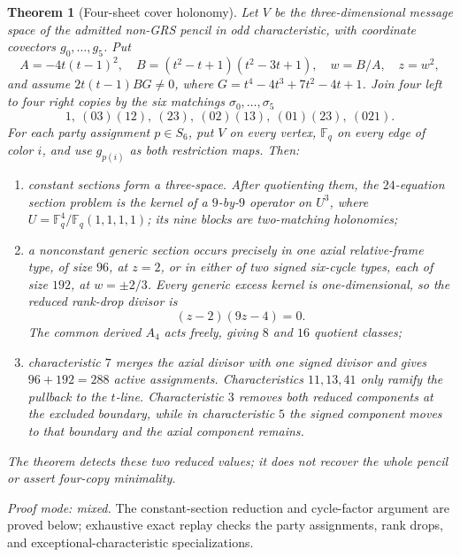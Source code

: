 \documentclass[11pt]{article}
\newtheorem{theorem}{Theorem}[section]
\theoremstyle{definition}
\theoremstyle{remark}
\newcommand{\F}{\mathbb{F}}
\begin{document}
\begin{theorem}[Four-sheet cover holonomy]
\label{thm:four-sheet-holonomy}
Let \(V\) be the three-dimensional message space of the admitted non-GRS
pencil in odd characteristic, with coordinate covectors \(g_0,\ldots,g_5\).
Put
\[
 A=-4t(t-1)^2,\quad
 B=(t^2-t+1)(t^2-3t+1),\quad
 w=B/A,\quad z=w^2,
\]
and assume \(2t(t-1)BG\ne0\), where
\(G=t^4-4t^3+7t^2-4t+1\).  Join four left to four right
copies by the six matchings \(\sigma_0,\ldots,\sigma_5\)
\[
 1,\ (03)(12),\ (23),\ (02)(13),\ (01)(23),\ (021).
\]
For each party assignment \(p\in S_6\), put \(V\) on every vertex,
\(\F_q\) on every edge of color \(i\), and use \(g_{p(i)}\) as both
restriction maps.  Then:
\begin{enumerate}[label=\textup{(\roman*)},leftmargin=*]
\item constant sections form a three-space.  After quotienting them, the
  \(24\)-equation section problem is the kernel of a \(9\)-by-\(9\)
  operator on \(U^3\), where
  \(U=\F_q^4/\F_q(1,1,1,1)\); its nine blocks are two-matching
  holonomies;
\item a nonconstant generic section occurs precisely in one axial
  relative-frame type, of size \(96\), at \(z=2\), or in either of two
  signed six-cycle types, each of size \(192\), at
  \(w=\pm2/3\).  Every generic excess kernel is one-dimensional, so the
  reduced rank-drop divisor is
  \[
     (z-2)(9z-4)=0.
  \]
  The common derived \(A_4\) acts freely, giving \(8\) and \(16\)
  quotient classes;
\item characteristic \(7\) merges the axial divisor with one signed
  divisor and gives \(96+192=288\) active assignments.  Characteristics
  \(11,13,41\) only ramify the pullback to the \(t\)-line.  Characteristic
  \(3\) removes both reduced components at the excluded boundary, while
  in characteristic \(5\) the signed component moves to that boundary
  and the axial component remains.
\end{enumerate}
The theorem detects these two reduced values; it does not recover the
whole pencil or assert four-copy minimality.
\end{theorem}
\noindent\emph{Proof mode: mixed.}  The constant-section reduction and
cycle-factor argument are proved below; exhaustive exact replay checks the
party assignments, rank drops, and exceptional-characteristic
specializations.
\end{document}
